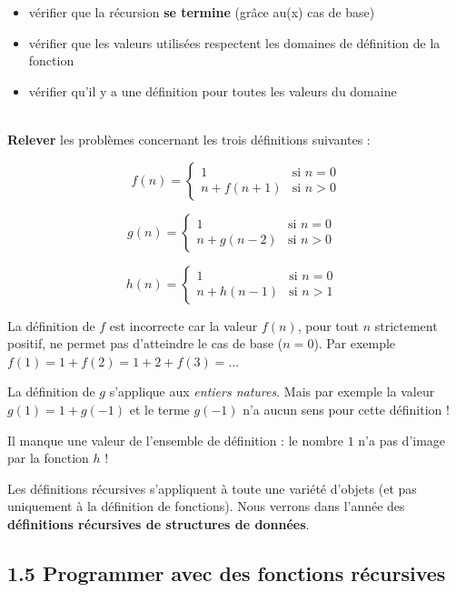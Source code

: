 \documentclass[a4paper,17pt]{extarticle}
\newenvironment{eleve}%
{\begin{activite}\color{noiramu}\\[-0.5cm]}
{\end{activite}}
\providecommand{\tightlist}{%
      \setlength{\itemsep}{0pt}\setlength{\parskip}{0pt}}
\begin{document}
\begin{itemize}
\tightlist
\item
  vérifier que la récursion \textbf{se termine} (grâce au(x) cas de
  base)
\item
  vérifier que les valeurs utilisées respectent les domaines de
  définition de la fonction
\item
  vérifier qu'il y a une définition pour toutes les valeurs du domaine
\end{itemize}
\begin{eleve}
    \textbf{Relever} les problèmes concernant les trois définitions
suivantes :

\[
f(n) = \left\{
\begin{array}{ll}
    1 & \text{si $n=0$} \\
    n+f(n+1) & \text{si $n>0$}
\end{array}
\right.
\]

\[
g(n) = \left\{
\begin{array}{ll}
     1& \text{si $n=0$ }\\
     n+g(n-2)& \text{si $n>0$ }
\end{array}
\right.
\]

\[
h(n) = \left\{
\begin{array}{ll}
     1& \text{si $n=0$ }\\
     n+h(n-1)& \text{si $n>1$ }
\end{array}
\right.
\]
        
        \end{eleve}\begin{reponse}
    La définition de \(f\) est incorrecte car la valeur \(f(n)\), pour tout
\(n\) strictement positif, ne permet pas d'atteindre le cas de base
(\(n=0\)). Par exemple \(f(1)=1+f(2)=1+2+f(3)=\ldots\)

La définition de \(g\) s'applique aux \emph{entiers natures}. Mais par
exemple la valeur \(g(1) = 1+g(-1)\) et le terme \(g(-1)\) n'a aucun
sens pour cette définition !

Il manque une valeur de l'ensemble de définition : le nombre \(1\) n'a
pas d'image par la fonction \(h\) !

            \end{reponse}\begin{remarque}
    Les définitions récursives s'appliquent à toute une variété d'objets (et
pas uniquement à la définition de fonctions). Nous verrons dans l'année
des \textbf{définitions récursives de structures de données}.

            \end{remarque}
    \hypertarget{programmer-avec-des-fonctions-ruxe9cursives}{%
\subsection{1.5 Programmer avec des fonctions
récursives}\label{programmer-avec-des-fonctions-ruxe9cursives}}
\end{document}
